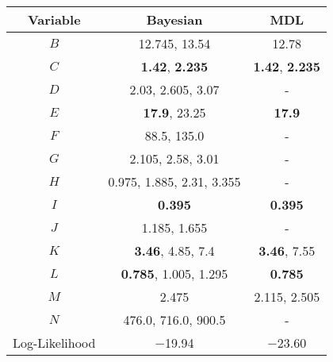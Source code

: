 \scriptsize
{}
\begin{tabular}{@{}ccc@{}}
\toprule
Variable & Bayesian            & MDL          \\
\midrule
$B$    & \num{12.745}, \num{13.54}                         & \num{12.78}        \\
$C$    & \textbf{\num{1.42}}, \textbf{\num{2.235}}                           & \textbf{\num{1.42}}, \textbf{\num{2.235}}  \\
$D$    & \num{2.03}, \num{2.605}, \num{3.07}               & -            \\
$E$    & \textbf{\num{17.9}}, \num{23.25}                           & \textbf{\num{17.9}}         \\
$F$    & \num{88.5}, \num{135.0}                           & -            \\
$G$    & \num{2.105}, \num{2.58}, \num{3.01}               & -            \\
$H$    & \num{0.975}, \num{1.885}, \num{2.31}, \num{3.355} & -            \\
$I$    & \textbf{\num{0.395}}                                       & \textbf{\num{0.395}}       \\
$J$    & \num{1.185}, \num{1.655}                          & -            \\
$K$    & \textbf{\num{3.46}}, \num{4.85}, \num{7.4}                 & \textbf{\num{3.46}}, \num{7.55}   \\
$L$    & \textbf{\num{0.785}}, \num{1.005}, 1.295                   & \textbf{\num{0.785}}        \\
$M$    & \num{2.475}                                       & \num{2.115}, \num{2.505} \\
$N$    & \num{476.0}, \num{716.0}, \num{900.5}             & -            \\
\addlinespace[0.5em]
Log-Likelihood   & \num{-19.94} & \num{-23.60}        \\
\bottomrule
\end{tabular}